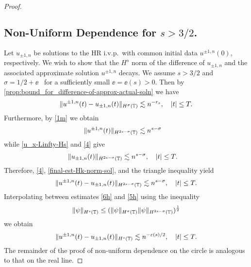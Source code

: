 \begin{proof}
\subsection*{Non-Uniform Dependence for $s > 3/2$.}
%
%
%
Let $u_{\pm 1, n}$ be solutions to the HR i.v.p.\ with common initial data 
$u^{\pm 1,
n}(0)$, respectively.
We wish to show that the $H^s$ norm of the difference of $u_{\pm 1,
n}$ and the associated approximate solution $u^{\pm 1, n}$ decays.
We assume
$s > 3/2 $ and $\sigma = 1/2 + \ee$ \ for a sufficiently small
$\ee= \ee(s) > 0$. 
Then by \cref{prop:bound_for_difference-of-approx-actual-soln} we 
have
%
%
\begin{equation}
\begin{split}
\|u^{\pm 1, n}(t) - u_{\pm 1, n} (t) \|_{H^\sigma (\mathbb{T})} \lesssim n^{-r_s}
\label{6h}, \quad |t| \le T.
\end{split}
\end{equation}
%
%
Furthermore, by \eqref{1m} we obtain
%
%
\begin{equation}
\begin{split}
\|u^{\pm 1, n} (t) \|_{H^{2s - \sigma} (\mathbb{T})}
& \lesssim n^{s-\sigma}
\label{4}
\end{split}
\end{equation}
%
%
while \eqref{u_x-Linfty-Hs} and \eqref{4} give
\begin{equation}
\begin{split}
\|u_{\pm 1, n} (t) \|_{H^{2s - \sigma}(\mathbb{T})}
& \lesssim n^{s- \sigma}, \quad |t| \le T.
\label{final-est-Hk-norm-sol}
\end{split}
\end{equation}
%
%
%
%
%
%
%
Therefore, \eqref{4}, \eqref{final-est-Hk-norm-sol}, and the triangle
inequality yield
%
%
\begin{equation}
\begin{split}
\|u^{\pm 1, n} (t) - u_{\pm 1, n}(t)\|_{H^{2s - \sigma}(\mathbb{T})}
\lesssim n^{s-\sigma}, \quad |t| \le T.
\label{5h}
\end{split}
\end{equation}
%
%
%
%
Interpolating between estimates \eqref{6h} and \eqref{5h} using the 
inequality
%
\begin{equation*}
\|\psi \|_{H^s (\mathbb{T})} \leq  (\| \psi \|_{H^\sigma (\mathbb{T})} \| \psi
\|_{H^{2s-\sigma}(\mathbb{T})})^\frac12
\end{equation*}
%
%
we obtain
%
%
\begin{equation}
\begin{split}
\|u^{\pm 1,n}(t) - u_{\pm 1, n}(t) \|_{H^s (\mathbb{T})} \lesssim
n^{-\varepsilon(s)/2}, \quad |t| \le T.
\label{10h}
\end{split}
\end{equation}
%
%
The remainder of the proof of non-uniform dependence on the circle is
analogous to that on the real line. 
\end{proof}
%
%
%
%
%
